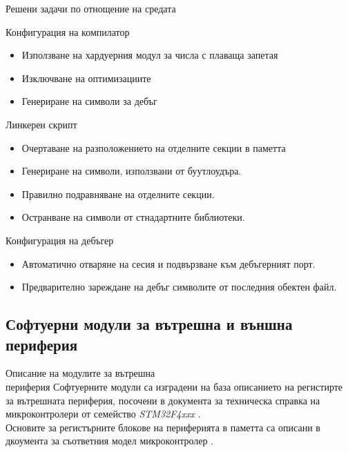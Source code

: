 \documentclass{beamer}
\begin{document}
\begin{frame}{Решени задачи по отнощение на средата}
	\pause
		\begin{block}{Конфигурация на компилатор}
			\begin{itemize}
				\pause
				\item Използване на хардуерния модул за числа с плаваща запетая
				\pause
				\item Изключване на оптимизациите
				\pause
				\item Генериране на символи за дебъг
			\end{itemize}
		\end{block}
\end{frame}

\begin{frame}[t]
	\pause
		\begin{block}{Линкерен скрипт}
			\begin{itemize}
				\pause
				\item Очертаване на разположението на отделните секции в паметта
				\pause
				\item Генериране на символи, използвани от буутлоудъра.
				\pause
				\item Правилно подравняване на отделните секции.
				\pause
				\item Остранване на символи от стнадартните библиотеки.
			\end{itemize}
		\end{block}

		\pause

	\begin{block}{Конфигурация на дебъгер}
		\begin{itemize}
			\pause
			\item Автоматично отваряне на сесия и подвързване към дебъгерният порт.
			\pause
			\item Предварително зареждане на дебъг символите от последния обектен файл.
		\end{itemize}
	\end{block}

\end{frame}


\subsection{Софтуерни модули за вътрешна и външна\\периферия}

\begin{frame}{Описание на модулите за вътрешна\\периферия}
	\pause
	Софтуерните модули са изградени на база описанието на регистирте за вътрешната периферия, посочени в 
	документа за техническа справка на микроконтролери от семейство \textit{STM32F4xxx} \cite{stmcurefman}.\\[1.5em]

	\pause
	Основите за регистърните блокове на периферията в паметта са описани в дкоумента за съответния
	модел микроконтролер \cite{stmmcudatasheet}.

\end{frame}
\end{document}
